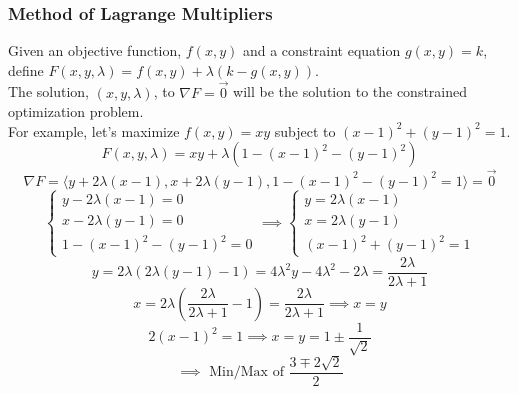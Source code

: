 \subsubsection{Method of Lagrange Multipliers}
\noindent
Given an objective function, $f(x,y)$ and a constraint equation $g(x,y) = k$, define $F(x,y,\lambda) = f(x,y) + \lambda(k-g(x,y))$.\\
The solution, $(x, y, \lambda)$, to $\nabla F = \vec{0}$ will be the solution to the constrained optimization problem.\\

\noindent
For example, let's maximize $f(x,y)=xy$ subject to $(x-1)^2 + (y-1)^2 = 1$.
\begin{equation*}
	F(x,y,\lambda) = xy + \lambda(1 - (x-1)^2 - (y-1)^2)	
\end{equation*}
\begin{equation*}
	\nabla F = \langle y + 2\lambda(x-1), x+2\lambda(y-1), 1 - (x-1)^2 - (y-1)^2 = 1 \rangle = \vec{0}
\end{equation*}
\begin{equation*}
	\begin{cases}
		y - 2\lambda(x-1) = 0 \\ 
		x - 2\lambda(y-1) = 0 \\ 
		1 - (x-1)^2 - (y-1)^2 = 0
	\end{cases}
	\implies \begin{cases}
		y = 2\lambda(x-1) \\ 
		x = 2\lambda(y-1) \\ 
		(x-1)^2 + (y-1)^2 = 1
	\end{cases}
\end{equation*}
\begin{equation*}
	y = 2\lambda(2\lambda(y-1) - 1) = 4\lambda^2 y - 4\lambda^2 - 2\lambda = \frac{2\lambda}{2\lambda+1}
\end{equation*}
\begin{equation*}
	x = 2\lambda\left(\frac{2\lambda}{2\lambda+1} - 1\right) = \frac{2\lambda}{2\lambda+1} \implies x = y	
\end{equation*}
\begin{equation*}
	2(x-1)^2 = 1 \implies x = y = 1 \pm \frac{1}{\sqrt{2}}	
\end{equation*}
\begin{equation*}
	\implies \text{ Min/Max of } \frac{3 \mp 2\sqrt{2}}{2}	
\end{equation*}